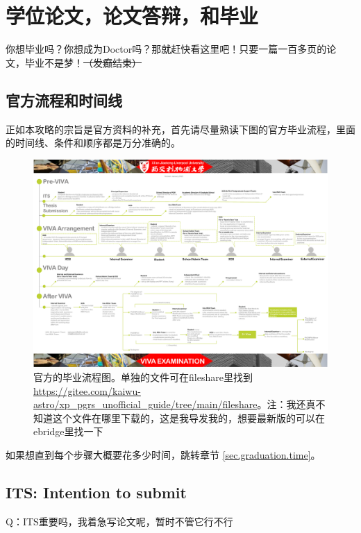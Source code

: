 \section{学位论文，论文答辩，和毕业}
\label{sec.thesis_viva_graduation}

你想毕业吗？你想成为Doctor吗？那就赶快看这里吧！只要一篇一百多页的论文，毕业不是梦！\sout{（发癫结束）}

\subsection{官方流程和时间线}
\label{sec.official.flowchart}

正如本攻略的宗旨是官方资料的补充，首先请尽量熟读下图的官方毕业流程，里面的时间线、条件和顺序都是万分准确的。

\begin{figure}[H]
    \centering
    \includegraphics[width=\columnwidth]{fileshare/XJTLU VIVA Examination Arrangement Flowchart_2023.pdf}
    \caption{官方的毕业流程图。单独的文件可在fileshare里找到\url{https://gitee.com/kaiwu-astro/xp_pgrs_unofficial_guide/tree/main/fileshare}。注：我还真不知道这个文件在哪里下载的，这是我导发我的，想要最新版的可以在ebridge里找一下}
\end{figure}

如果想直到每个步骤大概要花多少时间，跳转章节 \ref{sec.graduation.time}。

\subsection{ITS: Intention to submit}

Q：ITS重要吗，我着急写论文呢，暂时不管它行不行

